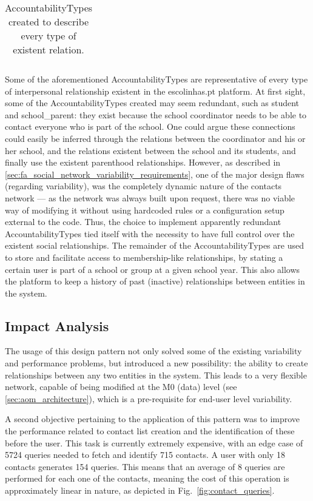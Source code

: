 \begin{center}
\begin{small}
\begin{longtable}{|l|l|l|l|p{5cm}|}
    \caption{AccountabilityTypes created to describe every type of existent relation.}
    \label{table:accountability_types}
    \end{longtable}
  \end{small}
\end{center}

Some of the aforementioned AccountabilityTypes are representative of every type of interpersonal relationship existent in the escolinhas.pt platform. At first sight, some of the AccountabilityTypes created may seem redundant, such as student and school\_parent: they exist because the school coordinator needs to be able to contact everyone who is part of the school. One could argue these connections could easily be inferred through the relations between the coordinator and his or her school, and the relations existent between the school and its students, and finally use the existent parenthood relationships. However, as described in \ref{sec:fa_social_network_variability_requirements}, one of the major design flaws (regarding variability), was the completely dynamic nature of the contacts network --- as the network was always built upon request, there was no viable way of modifying it without using hardcoded rules or a configuration setup external to the code. Thus, the choice to implement apparently redundant AccountabilityTypes tied itself with the necessity to have full control over the existent social relationships. The remainder of the AccountabilityTypes are used to store and facilitate access to membership-like relationships, by stating a certain user is part of a school or group at a given school year. This also allows the platform to keep a history of past (inactive) relationships between entities in the system.

\subsection{Impact Analysis}\label{sec:fa_social_network_impact_analysis}

The usage of this design pattern not only solved some of the existing variability and performance problems, but introduced a new possibility: the ability to create relationships between any two entities in the system. This leads to a very flexible network, capable of being modified at the M0 (data) level (see \ref{sec:aom_architecture}), which is a pre-requisite for end-user level variability.

A second objective pertaining to the application of this pattern was to improve the performance related to contact list creation and the identification of these before the user. This task is currently extremely expensive, with an edge case of 5724 queries needed to fetch and identify 715 contacts. A user with only 18 contacts generates 154 queries. This means that an average of 8 queries are performed for each one of the contacts, meaning the cost of this operation is approximately linear in nature, as depicted in Fig.~\ref{fig:contact_queries}.

